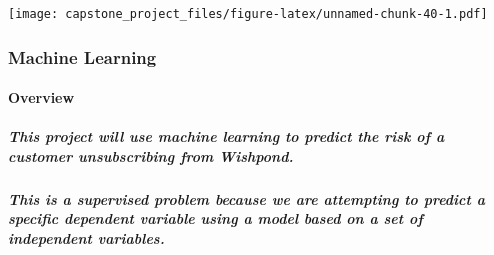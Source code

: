 \documentclass[]{article}
\newenvironment{Shaded}{\begin{snugshade}}{\end{snugshade}}
\newcommand{\KeywordTok}[1]{\textcolor[rgb]{0.13,0.29,0.53}{\textbf{#1}}}
\newcommand{\DataTypeTok}[1]{\textcolor[rgb]{0.13,0.29,0.53}{#1}}
\newcommand{\StringTok}[1]{\textcolor[rgb]{0.31,0.60,0.02}{#1}}
\newcommand{\OperatorTok}[1]{\textcolor[rgb]{0.81,0.36,0.00}{\textbf{#1}}}
\newcommand{\NormalTok}[1]{#1}
\let\oldparagraph\paragraph
\renewcommand{\paragraph}[1]{\oldparagraph{#1}\mbox{}}
\let\oldsubparagraph\subparagraph
\renewcommand{\subparagraph}[1]{\oldsubparagraph{#1}\mbox{}}
\begin{document}
\begin{Shaded}
\end{Shaded}

\texttt{[image: capstone\_project\_files/figure-latex/unnamed-chunk-40-1.pdf]}

\subsubsection{Machine Learning}\label{machine-learning}

\paragraph{Overview}\label{overview}

\subparagraph{This project will use machine learning to predict the risk
of a customer unsubscribing from
Wishpond.}\label{this-project-will-use-machine-learning-to-predict-the-risk-of-a-customer-unsubscribing-from-wishpond.}

\subparagraph{This is a supervised problem because we are attempting to
predict a specific dependent variable using a model based on a set of
independent
variables.}\label{this-is-a-supervised-problem-because-we-are-attempting-to-predict-a-specific-dependent-variable-using-a-model-based-on-a-set-of-independent-variables.}
\end{document}
